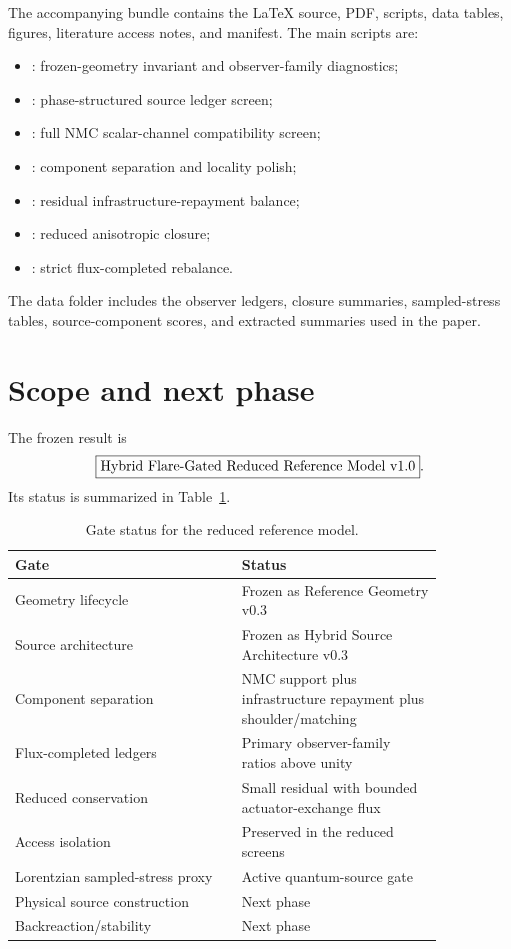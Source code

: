 \documentclass[11pt]{article}
\begin{document}
The accompanying bundle contains the LaTeX source, PDF, scripts, data tables, figures, literature access notes, and manifest.  The main scripts are:
\begingroup\small
\begin{itemize}
\item {}: frozen-geometry invariant and observer-family diagnostics;
\item {}: phase-structured source ledger screen;
\item {}: full NMC scalar-channel compatibility screen;
\item {}: component separation and locality polish;
\item {}: residual infrastructure-repayment balance;
\item {}: reduced anisotropic closure;
\item {}: strict flux-completed rebalance.
\end{itemize}
\endgroup
The data folder includes the observer ledgers, closure summaries, sampled-stress tables, source-component scores, and extracted summaries used in the paper.

\section{Scope and next phase}

The frozen result is
\begin{equation}
 \boxed{\hbox{Hybrid Flare-Gated Reduced Reference Model v1.0}}.
\end{equation}
Its status is summarized in Table~\ref{tab:status}.

\begin{table}[ht]
\centering
\caption{Gate status for the reduced reference model.}
\label{tab:status}
\begin{tabular}{p{0.45\linewidth}p{0.4\linewidth}}
\toprule
Gate & Status \\
\midrule
Geometry lifecycle & Frozen as Reference Geometry v0.3 \\
Source architecture & Frozen as Hybrid Source Architecture v0.3 \\
Component separation & NMC support plus infrastructure repayment plus shoulder/matching \\
Flux-completed ledgers & Primary observer-family ratios above unity \\
Reduced conservation & Small residual with bounded actuator-exchange flux \\
Access isolation & Preserved in the reduced screens \\
Lorentzian sampled-stress proxy & Active quantum-source gate \\
Physical source construction & Next phase \\
Backreaction/stability & Next phase \\
\bottomrule
\end{tabular}
\end{table}
\end{document}
